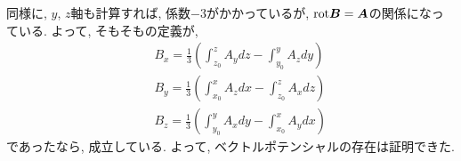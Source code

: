 \documentclass{jsarticle} \usepackage[dvipdfmx]{graphicx} \usepackage[dvipdfmx]{hyperref}
\newcommand*{\mbold}[1]{\mbox{\boldmath $#1$}}
\newcommand*{\rot}{{\rm rot}}
\begin{document}
同様に, $y$, $z$軸も計算すれば, 
係数$-3$がかかっているが, $\rot\mbold{B} = \mbold{A}$の関係になっている. 
よって, そもそもの定義が, 
\begin{subequations}
  \begin{eqnarray}
    && B_x = \frac{1}{3}\left(\int_{z_0}^z A_y dz - \int_{y_0}^y A_z dy \right)  \\
    && B_y = \frac{1}{3}\left(\int_{x_0}^x A_z dx - \int_{z_0}^z A_x dz \right)  \\
    && B_z = \frac{1}{3}\left(\int_{y_0}^y A_x dy - \int_{x_0}^x A_y dx \right)
  \end{eqnarray}
\end{subequations}
であったなら, 成立している. 
よって, ベクトルポテンシャルの存在は証明できた. 
\end{document}
